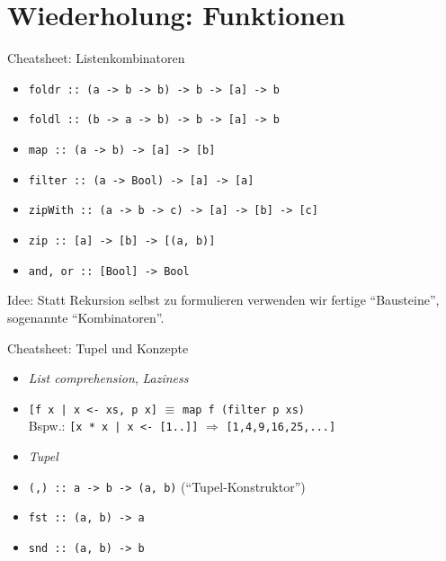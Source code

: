 \documentclass{beamer}
\begin{document}
\section{Wiederholung: Funktionen}

\begin{frame}{Cheatsheet: Listenkombinatoren}
  \begin{itemize}
    \item \texttt{foldr :: (a -> b -> b) -> b -> [a] -> b}
    \item \texttt{foldl :: (b -> a -> b) -> b -> [a] -> b}
    \item \texttt{map :: (a -> b) -> [a] -> [b]}
    \item \texttt{filter :: (a -> Bool) -> [a] -> [a]}
    \item \texttt{zipWith :: (a -> b -> c) -> [a] -> [b] -> [c]}
    \item \texttt{zip :: [a] -> [b] -> [(a, b)]}
    \item \texttt{and, or :: [Bool] -> Bool}
  \end{itemize}

  Idee: Statt Rekursion selbst zu formulieren verwenden wir fertige \enquote{Bausteine}, sogenannte \enquote{Kombinatoren}.
\end{frame}

\begin{frame}{Cheatsheet: Tupel und Konzepte}
  \begin{itemize}
    \item \emph{List comprehension}, \emph{Laziness}
    \item \texttt{[f x | x <- xs, p x]} $\equiv$ \texttt{map f (filter p xs)}\\
      Bspw.: \texttt{[x * x | x <- [1..]]} $\Rightarrow$ \texttt{[1,4,9,16,25,...]}
    \item \emph{Tupel}
    \item \texttt{(,) :: a -> b -> (a, b)} (\enquote{Tupel-Konstruktor})
    \item \texttt{fst :: (a, b) -> a}
    \item \texttt{snd :: (a, b) -> b}
  \end{itemize}
\end{frame}
\end{document}

